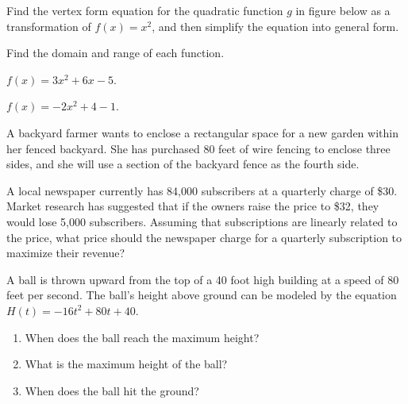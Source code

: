 \begin{example}
 Find the vertex form equation for the quadratic function $g$ in figure below as a transformation of $f(x)=x^2$, and then simplify the equation into general form.

\end{example}

\begin{example}
  Find the domain and range of each function.\\
  \begin{enumerate*}
    \item $f(x)=3x^2+6x-5$.
    \item $f(x)=-2x^2+4-1$.\hfill\null
  \end{enumerate*}
\end{example}

\begin{example}
  A backyard farmer wants to enclose a rectangular space for a new garden within her fenced backyard. She has purchased 80 feet of wire fencing to enclose three sides, and she will use a section of the backyard fence as the fourth side.
\end{example}

\newpage

\begin{example}
  A local newspaper currently has 84,000 subscribers at a quarterly charge of \$30. Market research has suggested that if the owners raise the price to \$32, they would lose 5,000 subscribers. Assuming that subscriptions are linearly related to the price, what price should the newspaper charge for a quarterly subscription to maximize their revenue?
\end{example}

\begin{example}
  A ball is thrown upward from the top of a 40 foot high building at a speed of 80 feet per second. The ball's height above ground can be modeled by the equation \(H(t)=-16t^2+80t+40\).
\begin{enumerate}
  \item When does the ball reach the maximum height?
  \item What is the maximum height of the ball?  
  \item When does the ball hit the ground?
\end{enumerate}
\end{example}

